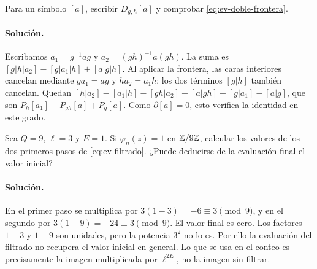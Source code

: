 \begin{ejercicio}
Para un símbolo $[a]$, escribir $D_{g,h}[a]$ y comprobar \eqref{eq:ev-doble-frontera}.
\end{ejercicio}
\paragraph{Solución.} Escribamos $a_1=g^{-1}ag$ y $a_2=(gh)^{-1}a(gh)$. La suma es $[g|h|a_2]-[g|a_1|h]+[a|g|h]$. Al aplicar la frontera, las caras interiores cancelan mediante $ga_1=ag$ y $ha_2=a_1h$; los dos términos $[g|h]$ también cancelan. Quedan $[h|a_2]-[a_1|h]-[gh|a_2]+[a|gh]+[g|a_1]-[a|g]$, que son $P_h[a_1]-P_{gh}[a]+P_g[a]$. Como $\partial[a]=0$, esto verifica la identidad en este grado.

\begin{ejercicio}
Sea $Q=9$, $\ell=3$ y $E=1$. Si $\varphi_n(z)=1$ en $\mathbb{Z}/9\mathbb{Z}$, calcular los valores de los dos primeros pasos de \eqref{eq:ev-filtrado}. ¿Puede deducirse de la evaluación final el valor inicial?
\end{ejercicio}
\paragraph{Solución.} En el primer paso se multiplica por $3(1-3)=-6\equiv3\pmod9$, y en el segundo por $3(1-9)=-24\equiv3\pmod9$. El valor final es cero. Los factores $1-3$ y $1-9$ son unidades, pero la potencia $3^2$ no lo es. Por ello la evaluación del filtrado no recupera el valor inicial en general. Lo que se usa en el conteo es precisamente la imagen multiplicada por $\ell^{2E}$, no la imagen sin filtrar.
